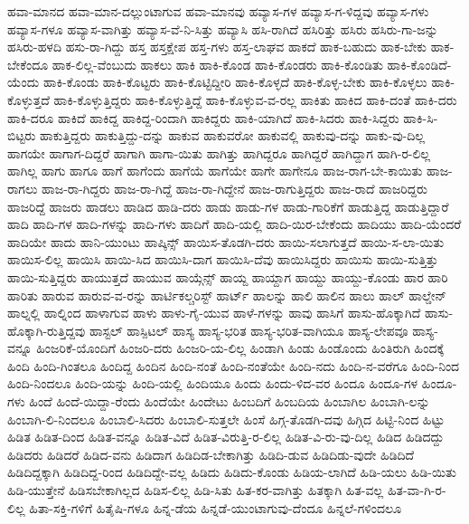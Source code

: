 {ಹವಾ-ಮಾನದ
ಹವಾ-ಮಾನ-ದಲ್ಲುಂಟಾಗುವ
ಹವಾ-ಮಾನವು
ಹವ್ಯಾಸ-ಗಳ
ಹವ್ಯಾಸ-ಗ-ಳಿದ್ದವು
ಹವ್ಯಾಸ-ಗಳು
ಹವ್ಯಾಸ-ಗಳೂ
ಹವ್ಯಾಸ-ವಾಗಿತ್ತು
ಹವ್ಯಾಸ-ವೆ-ನಿ-ಸಿತ್ತು
ಹವ್ಯಾಸಿ
ಹಸಿ-ರಾಗಿದೆ
ಹಸಿರಿತ್ತು
ಹಸಿರು
ಹಸಿರು-ಗಾ-ಜನ್ನು
ಹಸಿರು-ಹಳದಿ
ಹಸು-ರಾ-ಗಿದ್ದು
ಹಸ್ತ
ಹಸ್ತಕ್ಷೇಪ
ಹಸ್ತ-ಗಳು
ಹಸ್ತ-ಲಾಘವ
ಹಾಕದೆ
ಹಾಕ-ಬಹುದು
ಹಾಕ-ಬೇಕು
ಹಾಕ-ಬೇಕೆಂದೂ
ಹಾಕ-ಲಿಲ್ಲ-ವೆಂಬುದು
ಹಾಕಲು
ಹಾಕಿ
ಹಾಕಿ-ಕೊಂಡ
ಹಾಕಿ-ಕೊಂಡರು
ಹಾಕಿ-ಕೊಂಡಿತು
ಹಾಕಿ-ಕೊಂಡಿದೆ-ಯೆಂದು
ಹಾಕಿ-ಕೊಂಡು
ಹಾಕಿ-ಕೊಟ್ಟರು
ಹಾಕಿ-ಕೊಟ್ಟಿದ್ದೀರಿ
ಹಾಕಿ-ಕೊಳ್ಳದೆ
ಹಾಕಿ-ಕೊಳ್ಳ-ಬೇಕು
ಹಾಕಿ-ಕೊಳ್ಳಲು
ಹಾಕಿ-ಕೊಳ್ಳುತ್ತದೆ
ಹಾಕಿ-ಕೊಳ್ಳುತ್ತಿದ್ದರು
ಹಾಕಿ-ಕೊಳ್ಳುತ್ತಿದ್ದೆ
ಹಾಕಿ-ಕೊಳ್ಳುವ-ವ-ರಲ್ಲ
ಹಾಕಿತು
ಹಾಕಿದ
ಹಾಕಿ-ದಂತೆ
ಹಾಕಿ-ದರು
ಹಾಕಿ-ದರೂ
ಹಾಕಿದೆ
ಹಾಕಿದ್ದ
ಹಾಕಿದ್ದ-ರಿಂದಾಗಿ
ಹಾಕಿದ್ದರು
ಹಾಕಿ-ಯಾಗಿದೆ
ಹಾಕಿ-ಸಿದರು
ಹಾಕಿ-ಸಿದ್ದರು
ಹಾಕಿ-ಸಿ-ಬಿಟ್ಟರು
ಹಾಕುತ್ತಿದ್ದರು
ಹಾಕುತ್ತಿದ್ದು-ದನ್ನು
ಹಾಕುವ
ಹಾಕುವರೋ
ಹಾಕುವಲ್ಲಿ
ಹಾಕುವು-ದನ್ನು
ಹಾಕು-ವು-ದಿಲ್ಲ
ಹಾಗಯೇ
ಹಾಗಾಗ-ದಿದ್ದರೆ
ಹಾಗಾಗಿ
ಹಾಗಾ-ಯಿತು
ಹಾಗಿತ್ತು
ಹಾಗಿದ್ದರೂ
ಹಾಗಿದ್ದರೆ
ಹಾಗಿದ್ದಾಗ
ಹಾಗಿ-ರ-ಲಿಲ್ಲ
ಹಾಗಿಲ್ಲ
ಹಾಗು
ಹಾಗೂ
ಹಾಗೆ
ಹಾಗೆಂದು
ಹಾಗೆಯೆ
ಹಾಗೆಯೇ
ಹಾಗೇ
ಹಾಗೇನೂ
ಹಾಜ-ರಾಗ-ಬೇ-ಕಾಯಿತು
ಹಾಜ-ರಾಗಲು
ಹಾಜ-ರಾ-ಗಿದ್ದರು
ಹಾಜ-ರಾ-ಗಿದ್ದೆ
ಹಾಜ-ರಾ-ಗಿದ್ದೇನೆ
ಹಾಜ-ರಾಗುತ್ತಿದ್ದರು
ಹಾಜ-ರಾದೆ
ಹಾಜರಿದ್ದರು
ಹಾಜರಿದ್ದೆ
ಹಾಜರು
ಹಾಡಲು
ಹಾಡಿದ
ಹಾಡಿ-ದರು
ಹಾಡು
ಹಾಡು-ಗಳ
ಹಾಡು-ಗಾರಿಕೆಗೆ
ಹಾಡುತ್ತಿದ್ದ
ಹಾಡುತ್ತಿದ್ದಾರೆ
ಹಾದಿ
ಹಾದಿ-ಗಳ
ಹಾದಿ-ಗಳನ್ನು
ಹಾದಿ-ಗಳು
ಹಾದಿಗೆ
ಹಾದಿ-ಯಲ್ಲಿ
ಹಾದಿ-ಯಿರ-ಬೇಕೆಂದು
ಹಾದಿಯು
ಹಾದಿ-ಯೆಂದರೆ
ಹಾದಿಯೇ
ಹಾದು
ಹಾನಿ-ಯುಂಟು
ಹಾಪ್ಕಿನ್ಸ್
ಹಾಯಿಸ-ತೊಡಗಿ-ದರು
ಹಾಯಿ-ಸಲಾಗುತ್ತದೆ
ಹಾಯಿ-ಸ-ಲಾ-ಯಿತು
ಹಾಯಿಸ-ಲಿಲ್ಲ
ಹಾಯಿಸಿ
ಹಾಯಿ-ಸಿದ
ಹಾಯಿಸಿ-ದಾಗ
ಹಾಯಿಸಿ-ದೆವು
ಹಾಯಿಸಿದ್ದರು
ಹಾಯಿಸು
ಹಾಯಿ-ಸುತ್ತಿತ್ತು
ಹಾಯಿ-ಸುತ್ತಿದ್ದರು
ಹಾಯುತ್ತದೆ
ಹಾಯುವ
ಹಾಯ್ಗೆನ್ಸ್
ಹಾಯ್ದ
ಹಾಯ್ದಾಗ
ಹಾಯ್ದು
ಹಾಯ್ದು-ಕೊಂಡು
ಹಾರ
ಹಾರಿ
ಹಾರಿತು
ಹಾರುವ
ಹಾರುವ-ವ-ರನ್ನು
ಹಾರ್ಟಿಕಲ್ಚರಿಸ್ಟ್
ಹಾರ್ಟ್
ಹಾಲನ್ನು
ಹಾಲಿ
ಹಾಲಿನ
ಹಾಲು
ಹಾಲ್
ಹಾಲ್ಡೇನ್
ಹಾಲ್ನಲ್ಲಿ
ಹಾಲ್ನಿಂದ
ಹಾಳಾಗುವ
ಹಾಳು
ಹಾಳು-ಗೈ-ಯುವ
ಹಾಳೆ-ಗಳನ್ನು
ಹಾವು
ಹಾಸಿಗೆ
ಹಾಸು-ಹೊಕ್ಕಾಗಿದೆ
ಹಾಸು-ಹೊಕ್ಕಾಗಿ-ರುತ್ತಿದ್ದವು
ಹಾಸ್ಟಲ್
ಹಾಸ್ಪಿಟಲ್
ಹಾಸ್ಯ
ಹಾಸ್ಯ-ಭರಿತ
ಹಾಸ್ಯ-ಭರಿತ-ವಾಗಿಯೂ
ಹಾಸ್ಯ-ಲೇಪವೂ
ಹಾಸ್ಯ-ವನ್ನೂ
ಹಿಂಜರಿಕೆ-ಯೊಂದಿಗೆ
ಹಿಂಜರಿ-ದರು
ಹಿಂಜರಿ-ಯ-ಲಿಲ್ಲ
ಹಿಂಡಾಗಿ
ಹಿಂಡು
ಹಿಂಡೊಂದು
ಹಿಂತಿರುಗಿ
ಹಿಂದಕ್ಕೆ
ಹಿಂದಿ
ಹಿಂದಿ-ಗಿಂತಲೂ
ಹಿಂದಿದ್ದ
ಹಿಂದಿನ
ಹಿಂದಿ-ನಂತೆ
ಹಿಂದಿ-ನಂತೆಯೇ
ಹಿಂದಿ-ನದು
ಹಿಂದಿ-ನ-ವರೆಗೂ
ಹಿಂದಿ-ನಿಂದ
ಹಿಂದಿ-ನಿಂದಲೂ
ಹಿಂದಿ-ಯನ್ನು
ಹಿಂದಿ-ಯಲ್ಲಿ
ಹಿಂದಿಯೂ
ಹಿಂದು
ಹಿಂದು-ಳಿದ-ವರ
ಹಿಂದೂ
ಹಿಂದೂ-ಗಳ
ಹಿಂದೂ-ಗಳು
ಹಿಂದೆ
ಹಿಂದೆ-ಯಿದ್ದಾ-ರೆಂದು
ಹಿಂದೆಯೇ
ಹಿಂದೇಟು
ಹಿಂಬದಿಗೆ
ಹಿಂಬದಿಯ
ಹಿಂಬಾಗಿಲ
ಹಿಂಬಾಗಿ-ಲನ್ನು
ಹಿಂಬಾಗಿ-ಲಿ-ನಿಂದಲೂ
ಹಿಂಬಾಲಿ-ಸಿದರು
ಹಿಂಬಾಲಿ-ಸುತ್ತಲೇ
ಹಿಂಸೆ
ಹಿಗ್ಗ-ತೊಡಗಿ-ದವು
ಹಿಗ್ಗಿದ
ಹಿಟ್ಟಿ-ನಿಂದ
ಹಿಟ್ಟು
ಹಿಡಿತ
ಹಿಡಿತ-ದಿಂದ
ಹಿಡಿತ-ವನ್ನೂ
ಹಿಡಿತ-ವಿದೆ
ಹಿಡಿತ-ವಿರುತ್ತಿ-ರ-ಲಿಲ್ಲ
ಹಿಡಿತ-ವಿ-ರು-ವು-ದಿಲ್ಲ
ಹಿಡಿದ
ಹಿಡಿದದ್ದು
ಹಿಡಿದರು
ಹಿಡಿದರೆ
ಹಿಡಿದ-ವನು
ಹಿಡಿದಾಗ
ಹಿಡಿದಿಡ-ಬೇಕಾಗಿತ್ತು
ಹಿಡಿದಿ-ಡುವ
ಹಿಡಿದಿಡು-ವುದೇ
ಹಿಡಿದಿದೆ
ಹಿಡಿದಿದ್ದಕ್ಕಾಗಿ
ಹಿಡಿದಿದ್ದ-ರಿಂದ
ಹಿಡಿದಿದ್ದೇ-ವಲ್ಲ
ಹಿಡಿದು
ಹಿಡಿದು-ಕೊಂಡು
ಹಿಡಿಯ-ಲಾಗಿದೆ
ಹಿಡಿ-ಯಲು
ಹಿಡಿ-ಯಿತು
ಹಿಡಿ-ಯುತ್ತೇನೆ
ಹಿಡಿಸಬೇಕಾಗಿಲ್ಲದ
ಹಿಡಿಸ-ಲಿಲ್ಲ
ಹಿಡಿ-ಸಿತು
ಹಿತ-ಕರ-ವಾಗಿತ್ತು
ಹಿತಕ್ಕಾಗಿ
ಹಿತ-ವಲ್ಲ
ಹಿತ-ವಾ-ಗಿ-ರ-ಲಿಲ್ಲ
ಹಿತಾ-ಸಕ್ತಿ-ಗಳಿಗೆ
ಹಿತೈಷಿ-ಗಳೂ
ಹಿನ್ನ-ಡೆಯ
ಹಿನ್ನಡೆ-ಯುಂಟಾಗುವು-ದೆಂದೂ
ಹಿನ್ನಲೆ-ಗಳಿಂದಲೂ
}
